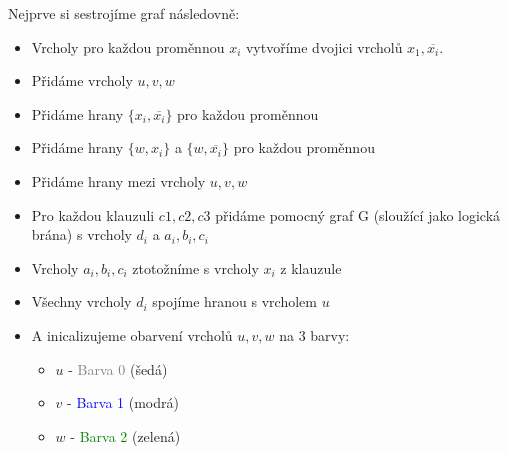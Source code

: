 \documentclass[10pt, a4paper]{ReportSheet}
\begin{document}
\begin{uloha}{14}{2}
        Nejprve si sestrojíme graf následovně:
        \begin{itemize}
            \item Vrcholy pro každou proměnnou $x_i$ vytvoříme dvojici vrcholů $x_1,\overline{x_i}$.
            \item Přidáme vrcholy $u, v, w$
            \item Přidáme hrany $\{x_i,\overline{x_i}\}$ pro každou proměnnou
            \item Přidáme hrany $\{w,x_i\}$ a $\{w,\overline{x_i}\}$ pro každou proměnnou
            \item Přidáme hrany mezi vrcholy $u, v, w$
            \item Pro každou klauzuli $c1, c2, c3$ přidáme pomocný graf G (sloužící jako logická brána) s vrcholy $d_i$ a $a_i, b_i, c_i$
            \item Vrcholy $a_i, b_i, c_i$ ztotožníme s vrcholy $x_i$ z klauzule
            \item Všechny vrcholy $d_i$ spojíme hranou s vrcholem $u$
            \item A inicalizujeme obarvení vrcholů $u, v, w$ na 3 barvy:
            \begin{itemize}
                \item $u$ - \textcolor{gray}{Barva 0} (šedá)
                \item $v$ - \textcolor{blue}{Barva 1} (modrá)
                \item $w$ - \textcolor{green}{Barva 2} (zelená)
            \end{itemize}
        \end{itemize}

        \begin{figure}[H]
            \centering
\end{figure}
\end{uloha}
\end{document}
